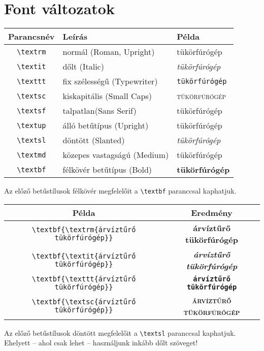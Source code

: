\documentclass{article}
\begin{document}
\parindent 0pt
\section*{Font változatok}

\begin{tabular}{c|l|l}	
	\textbf{Parancsnév}& \textbf{Leírás}&\textbf{Példa}\\	     
	\hline
	\verb!\textrm!& normál (Roman, Upright)   & \textup{tükörfúrógép}\\		
	\verb!\textit!& dőlt (Italic) &\textit{tükörfúrógép}\\	
	\verb!\texttt!& fix szélességű (Typewriter) &\texttt{tükörfúrógép}\\	
	\verb!\textsc!& kiskapitális (Small Caps) &\textsc{tükörfúrógép}\\
	\verb!\textsf!& talpatlan(Sans Serif) &\textsf{tükörfúrógép}\\
	\verb!\textup!& álló betűtípus (Upright) &\textup{tükörfúrógép}\\
	\verb!\textsl!& döntött (Slanted)&\textsl{tükörfúrógép}\\
	\verb!\textmd!& közepes vastagságú (Medium) &\textmd{tükörfúrógép}\\
	\verb!\textbf!& félkövér betűtípus (Bold) &\textbf{tükörfúrógép}\\
\end{tabular}


\vspace*{0.2in}
Az előző betűstílusok félkövér megfelelőit a \verb!\textbf! paranccsal kaphatjuk.
\vspace*{0.2in}

\begin{tabular}{|c|c|}
\hline	
\textbf{Példa}  & \textbf{Eredmény} \\
\hline
\verb!\textbf{\textrm{árvíztűrő tükörfúrógép}}! & \textbf{\textrm{árvíztűrő tükörfúrógép}} \\
\verb!\textbf{\textit{árvíztűrő tükörfúrógép}}! &  \textbf{\textit{árvíztűrő  tükörfúrógép}} \\
\verb!\textbf{\texttt{árvíztűrő tükörfúrógép}}! & \textbf{\texttt{árvíztűrő tükörfúrógép}}  \\
\verb!\textbf{\textsc{árvíztűrő tükörfúrógép}}! &  \textbf{\textsc{árvíztűrő tükörfúrógép}} \\
	\hline
\end{tabular}

\vspace*{0.2in}
Az előző betűstílusok döntött megfelelőit a \verb!\textsl! paranccsal kaphatjuk. Ehelyett -- ahol csak lehet -- használjunk inkább dőlt szöveget!
\vspace*{0.2in}
\end{document}
